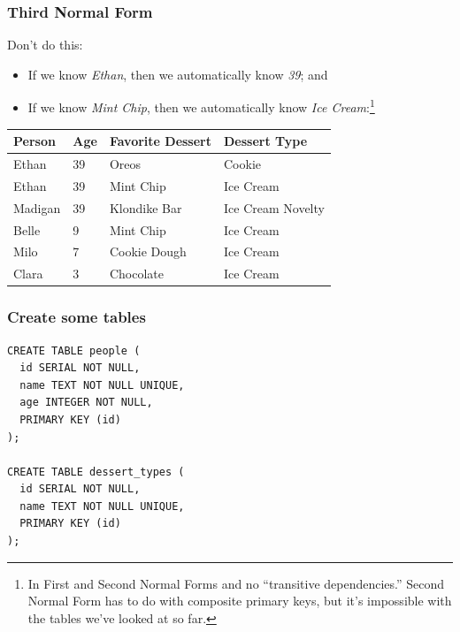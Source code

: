 \documentclass[aspectratio=169]{beamer}
\begin{document}
\begin{frame}
  \frametitle{Third Normal Form}
  Don't do this:

  \begin{itemize}
    \item If we know \textit{Ethan}, then we automatically know
          \textit{39}; and
    \item If we know \textit{Mint Chip}, then we automatically
          know \textit{Ice Cream}:\footnote{In First and Second Normal Forms
            and no ``transitive dependencies.'' Second Normal Form has to do
            with composite primary keys, but it's impossible with the tables
            we've looked at so far.}
  \end{itemize}

  \begin{table}[]
    \footnotesize
    \begin{tabular}{@{}llll@{}}
      \toprule
      Person  & Age & Favorite Dessert & Dessert Type      \\ \midrule
      Ethan   & 39  & Oreos            & Cookie            \\
      Ethan   & 39  & Mint Chip        & Ice Cream         \\
      Madigan & 39  & Klondike Bar     & Ice Cream Novelty \\
      Belle   & 9   & Mint Chip        & Ice Cream         \\
      Milo    & 7   & Cookie Dough     & Ice Cream         \\
      Clara   & 3   & Chocolate        & Ice Cream         \\ \bottomrule
    \end{tabular}
  \end{table}

\end{frame}

\begin{frame}[fragile]
  \frametitle{Create some tables}

  \begin{lstlisting}
CREATE TABLE people (
  id SERIAL NOT NULL,
  name TEXT NOT NULL UNIQUE,
  age INTEGER NOT NULL,
  PRIMARY KEY (id)
);

CREATE TABLE dessert_types (
  id SERIAL NOT NULL,
  name TEXT NOT NULL UNIQUE,
  PRIMARY KEY (id)
);
  \end{lstlisting}
\end{frame}
\end{document}

